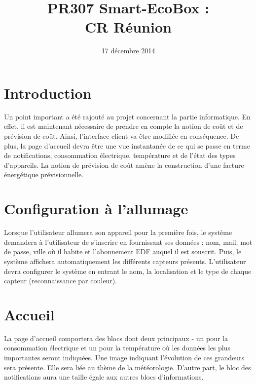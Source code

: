 \documentclass[10pt,a4paper]{article}
\title{PR307 Smart-EcoBox : \\ CR Réunion}
\author{}
\date{17 décembre 2014}
\begin{document}
\maketitle

\section{Introduction}

Un point important a été rajouté au projet concernant la partie informatique. En effet, il est maintenant nécessaire de prendre en compte la notion de coût et de prévision de coût. Ainsi, l'interface client va être modifiée en conséquence. De plus, la page d'accueil devra être une vue instantanée de ce qui se passe en terme de notifications, consommation électrique, température et de l'état des types d'appareils. La notion de prévision de coût amène la construction d'une facture énergétique prévisionnelle.

\section{Configuration à l'allumage}

Lorsque l'utilisateur allumera son appareil pour la première fois, le système demandera à l'utilisateur de s'inscrire en fournissant ses données : nom, mail, mot de passe, ville où il habite et l'abonnement EDF auquel il est souscrit. Puis, le système affichera automatiquement les différents capteurs présents. L'utilisateur devra configurer le système en entrant le nom, la localisation et le type de chaque capteur (reconnaissance par couleur).

\section{Accueil}

La page d'accueil comportera des blocs dont deux principaux - un pour la consommation électrique et un pour la température où les données les plus importantes seront indiquées. Une image indiquant l'évolution de ces grandeurs sera présente. Elle sera liée au thème de la météorologie. D'autre part, le bloc des notifications aura une taille égale aux autres blocs d'informations.\\
\end{document}
